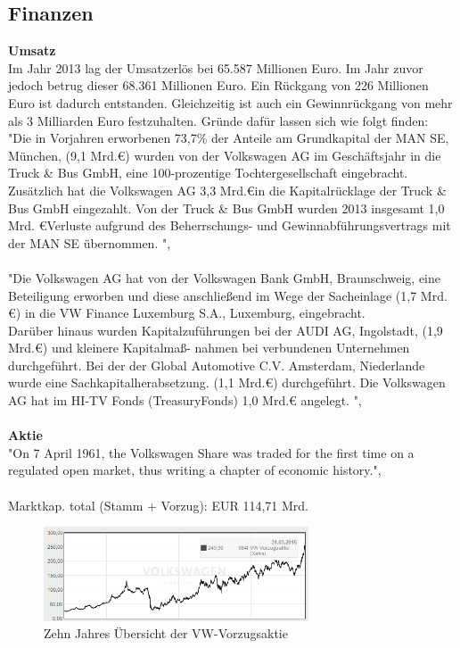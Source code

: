 \documentclass[12pt]{article}
\begin{document}
\subsection{Finanzen}
\textbf{Umsatz}\\
Im Jahr 2013 lag der Umsatzerlös bei 65.587 Millionen Euro. Im Jahr zuvor jedoch betrug dieser 68.361 Millionen Euro. Ein Rückgang von 226 Millionen Euro ist dadurch entstanden. Gleichzeitig ist auch ein Gewinnrückgang von mehr als 3 Milliarden Euro festzuhalten. Gründe dafür lassen sich wie folgt finden:
\\
"Die in Vorjahren erworbenen 73,7\% der Anteile am Grundkapital der MAN SE, München, (9,1 Mrd.\euro) wurden von
der Volkswagen AG im Geschäftsjahr in die Truck \& Bus GmbH, eine 100-prozentige Tochtergesellschaft eingebracht.
Zusätzlich hat die Volkswagen AG 3,3 Mrd.\euro in die Kapitalrücklage der Truck \& Bus GmbH eingezahlt. Von der Truck \&
Bus GmbH wurden 2013 insgesamt 1,0 Mrd. \euro Verluste aufgrund des Beherrschungs- und Gewinnabführungsvertrags
mit der MAN SE übernommen. ",\cite[Seite 3]{jbilanz2013vw}
\\\\
"Die Volkswagen AG hat von der Volkswagen Bank GmbH, Braunschweig, eine Beteiligung erworben und diese anschließend im Wege der Sacheinlage (1,7 Mrd.\euro) in die VW Finance Luxemburg S.A., Luxemburg, eingebracht.\\
Darüber hinaus wurden Kapitalzuführungen bei der AUDI AG, Ingolstadt, (1,9 Mrd.\euro) und kleinere Kapitalmaß-
nahmen bei verbundenen Unternehmen durchgeführt. Bei der der Global Automotive C.V. Amsterdam, Niederlande
wurde eine Sachkapitalherabsetzung. (1,1 Mrd.\euro) durchgeführt. Die Volkswagen AG hat im HI-TV Fonds (TreasuryFonds) 1,0 Mrd.€ angelegt. ",\cite[Seite 4]{jbilanz2013vw}
\\ \\ 
\textbf{Aktie} \\
"On 7 April 1961, the Volkswagen Share was traded for the first time on a regulated open market, thus writing a chapter of economic history.",\cite{vsc50y} \\
\\
Marktkap. total (Stamm + Vorzug): EUR 114,71 Mrd.
\begin{figure}[here!]
\centering
\includegraphics[width=0.7\textwidth]{images/finanzen2015}
\caption{Zehn Jahres Übersicht der VW-Vorzugsaktie \cite{aktienfotos}}
\label{fig:vwaktie1}
\end{figure}\FloatBarrier
\end{document}
